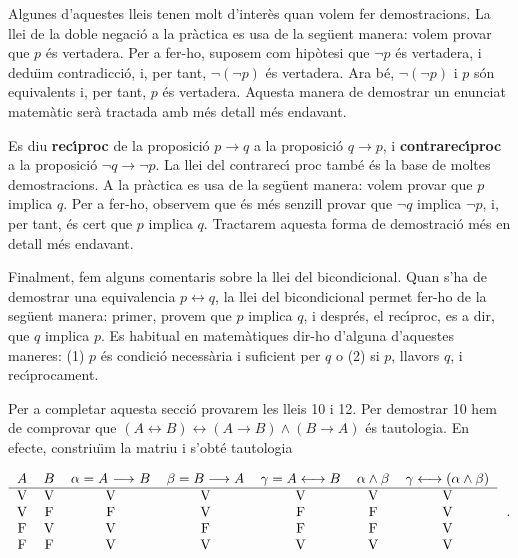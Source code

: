 Algunes d'aquestes lleis tenen molt d'inter\`{e}s quan volem fer
demostracions. La llei de la doble negaci\'{o} a la pr\`{a}ctica es usa de
la seg\"{u}ent manera: volem provar que $p$ \'{e}s vertadera. Per a fer-ho,
suposem com hip\`{o}tesi que $\lnot p$ \'{e}s vertadera, i dedu\"{\i}m
contradicci\'{o}, i, per tant, $\lnot\left( \lnot p\right) $ \'{e}s
vertadera. Ara b\'{e}, $\lnot\left( \lnot p\right) $ i $p$ s\'{o}n
equivalents i, per tant, $p$ \'{e}s vertadera. Aquesta manera de demostrar
un enunciat matem\`{a}tic ser\`{a} tractada amb m\'{e}s detall m\'{e}s
endavant.

\bigskip

Es diu \textbf{rec\'{\i}proc} de la proposici\'{o} $p\longrightarrow q$ a la
proposici\'{o} $q\longrightarrow p$, i \textbf{contrarec\'{\i}proc} a la
proposici\'{o} $\lnot q\longrightarrow\lnot p$. La llei del contrarec\'{\i}%
proc tamb\'{e} \'{e}s la base de moltes demostracions. A la pr\`{a}ctica es
usa de la seg\"{u}ent manera: volem provar que $p$ implica $q$. Per a
fer-ho, observem que \'{e}s m\'{e}s senzill provar que $\lnot q$ implica $%
\lnot p$, i, per tant, \'{e}s cert que $p$ implica $q$. Tractarem aquesta
forma de demostraci\'{o} m\'{e}s en detall m\'{e}s endavant.

\bigskip

Finalment, fem alguns comentaris sobre la llei del bicondicional. Quan s'ha
de demostrar una equivalencia $p\longleftrightarrow q$, la llei del
bicondicional permet fer-ho de la seg\"{u}ent manera: primer, provem que $p$
implica $q$, i despr\'{e}s, el rec\'{\i}proc, es a dir, que $q$ implica $p$.
Es habitual en matem\`{a}tiques dir-ho d'alguna d'aquestes maneres: (1) $p$
\'{e}s condici\'{o} necess\`{a}ria i suficient per $q$ o (2) si $p$, llavors
$q$, i rec\'{\i}procament.

\bigskip

Per a completar aquesta secci\'{o} provarem les lleis 10 i 12. Per demostrar
10 hem de comprovar que $\left( A\longleftrightarrow B\right)
\longleftrightarrow\left( A\longrightarrow B\right) \wedge\left(
B\longrightarrow A\right) $ \'{e}s tautologia. En efecte, constriu\"{\i}m la
matriu i s'obt\'{e} tautologia

\begin{equation*}
\begin{tabular}{ccccccc}
$A$ & $B$ & $\alpha=A$ $\longrightarrow$ $B$ & $\beta=B\longrightarrow A$ & $%
\gamma=A\longleftrightarrow B$ & $\alpha\wedge\beta$ & $\gamma
\longleftrightarrow\left( \alpha\wedge\beta\right) $ \\ \hline
V & V & V & V & V & V & V \\
V & F & F & V & F & F & V \\
F & V & V & F & F & F & V \\
F & F & V & V & V & V & V%
\end{tabular}
\text{.}
\end{equation*}

